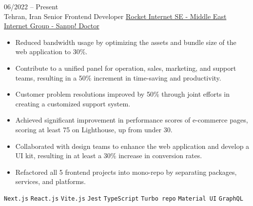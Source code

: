 \documentclass[8pt]{developercv} %
\begin{document}
    \vspace{-10 pt}
    \begin{entrylist}
        \entry
        {06/2022 -- Present \\ Tehran, Iran}
        {Senior Frontend Developer}
        {\href{https://snapp.doctor/}{Rocket Internet SE - Middle East Internet Group - Sanpp! Doctor}}
        {\vspace{-10pt}
            \begin{itemize}[noitemsep,topsep=0pt,parsep=0pt,partopsep=0pt, leftmargin=-1pt]
                \item Reduced bandwidth usage by optimizing the assets and bundle size of the web application to 30\%.
                \item Contribute to a unified panel for operation, sales, marketing, and support teams, resulting in a 50\% increment in time-saving and productivity.
                \item Customer problem resolutions improved by 50\% through joint efforts in creating a customized support system.
                \item Achieved significant improvement in performance scores of e-commerce pages, scoring at least 75 on Lighthouse, up from under 30.
                \item Collaborated with design teams to enhance the web application and develop a UI kit, resulting in at least a 30\% increase in conversion rates.
                \item Refactored all 5 frontend projects into mono-repo by separating packages, services, and platforms.
            \end{itemize}
            \texttt{Next.js} \slashsep \texttt{React.js} \slashsep \texttt{Vite.js} \slashsep \texttt{Jest} \slashsep \texttt{TypeScript} \slashsep \texttt{Turbo repo} \slashsep \texttt{Material UI} \slashsep \texttt{GraphQL}
        }


\end{entrylist}
\end{document}

